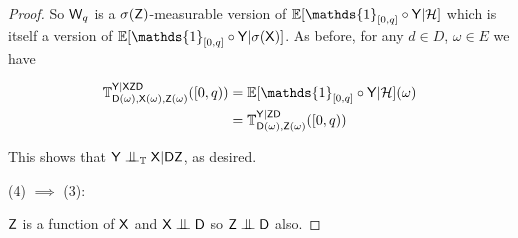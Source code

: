 \begin{proof}
So $\mathsf{W}_q$ is a $\sigma(\mathsf{Z})$-measurable version of $\mathbb{E}[\mathds{1}_{[0,q]}\circ\RV{Y}|\sigalg{H}]$ which is itself a version of $\mathbb{E}[\mathds{1}_{[0,q]}\circ\RV{Y}|\sigma(\RV{X})]$. As before, for any $d\in D$, $\omega\in E$ we have

\begin{align}
    \kernel{T}_{\RV{D}(\omega),\RV{X}(\omega),\RV{Z}(\omega)}^{\RV{Y}|\RV{X}\RV{Z}\RV{D}}([0,q)) &= \mathbb{E}[\mathds{1}_{[0,q]}\circ\RV{Y}|\sigalg{H}](\omega)\\
                                                                                                 &= \kernel{T}_{\RV{D}(\omega),\RV{Z}(\omega)}^{\RV{Y}|\RV{Z}\RV{D}}([0,q))
\end{align}

 This shows that $\RV{Y}\CI_{\kernel{T}} \RV{X}|\RV{D}\RV{Z}$, as desired.


(4) $\implies$ (3):

$\mathsf{Z}$ is a function of $\mathsf{X}$ and $\RV{X}\CI\RV{D}$ so $\RV{Z}\CI\RV{D}$ also. 


\end{proof}
